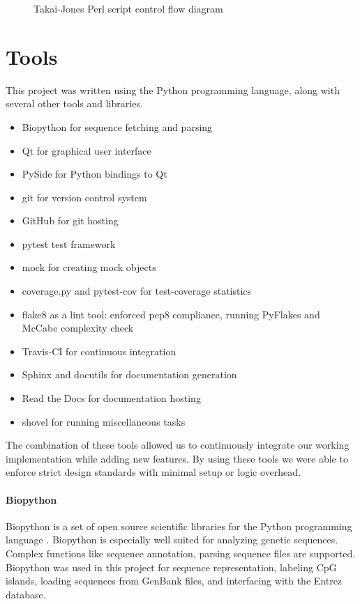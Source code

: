 \documentclass{bioinfo}
\begin{document}
\begin{figure}[H]
  \label{fig:tj-control-flow}
  \caption{Takai-Jones Perl script control flow diagram}
  \begin{dot2tex}[scale=0.3]
    
  \end{dot2tex}
\end{figure}

\section{Tools}

This project was written using the Python programming language, along with several other tools and libraries.

\begin{itemize}
\item Biopython for sequence fetching and parsing
\item Qt for graphical user interface
\item PySide for Python bindings to Qt
\item git for version control system
\item GitHub for git hosting
\item pytest test framework
\item mock for creating mock objects
\item coverage.py and pytest-cov for test-coverage statistics
\item flake8 as a lint tool: enforced pep8 compliance, running PyFlakes and McCabe complexity check
\item Travis-CI for continuous integration
\item Sphinx and docutils for documentation generation
\item Read the Docs for documentation hosting
\item shovel for running miscellaneous tasks
\end{itemize}

The combination of these tools allowed us to continuously integrate our working implementation while adding new features. By using these tools we were able to enforce strict design standards with minimal setup or logic overhead.

\paragraph{Biopython\textcolon}
      Biopython is a set of open source scientific libraries for the Python programming language \citep{pmid19304878}. Biopython is especially well suited for analyzing genetic sequences. Complex functions like sequence annotation, parsing sequence files are supported. Biopython was used in this project for sequence representation, labeling CpG islands, loading sequences from GenBank files, and interfacing with the Entrez database.\\
    
\end{document}
